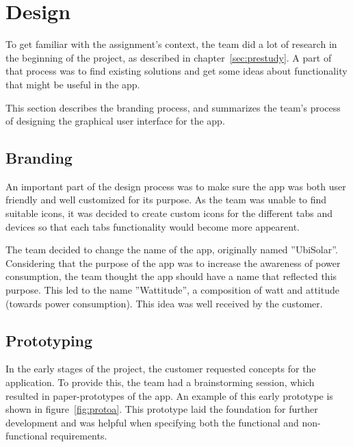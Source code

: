 \section{Design}
To get familiar with the assignment's context, the team did a lot of research in the beginning of the project, as described in chapter~\ref{sec:prestudy}. A part of that process was to find existing solutions and get some ideas about functionality that might be useful in the app.

This section describes the branding process, and summarizes the team's process of designing the graphical user interface for the app.

\subsection{Branding}
An important part of the design process was to make sure the app was both user friendly and well customized for its purpose. As the team was unable to find suitable icons, it was decided to create custom icons for the different tabs and devices so that each tabs functionality would become more appearent.

The team decided to change the name of the app, originally named ''UbiSolar''. Considering that the purpose of the app was to increase the awareness of power consumption, the team thought the app should have a name that reflected this purpose. This led to the name ''Wattitude'', a composition of watt and attitude (towards power consumption). This idea was well received by the customer.

\subsection{Prototyping}
In the early stages of the project, the customer requested concepts for the application. To provide this, the team had a brainstorming session, which resulted in paper-prototypes of the app. An example of this early prototype is shown in figure~\ref{fig:protoa}. This prototype laid the foundation for further development and was helpful when specifying both the functional and non-functional requirements.

